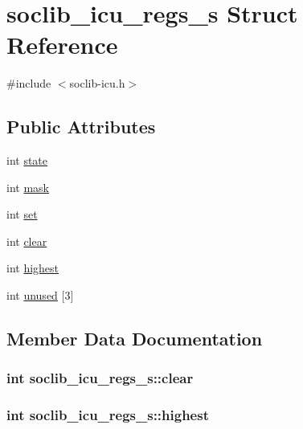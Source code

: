 \hypertarget{structsoclib__icu__regs__s}{\section{soclib\-\_\-icu\-\_\-regs\-\_\-s Struct Reference}
\label{structsoclib__icu__regs__s}
}


{\ttfamily \#include $<$soclib-\/icu.\-h$>$}

\subsection*{Public Attributes}
\begin{DoxyCompactItemize}
\item 
int \hyperlink{structsoclib__icu__regs__s_a598718b6403f6a06261e28246093c3c6}{state}
\item 
int \hyperlink{structsoclib__icu__regs__s_a441bc8ac5b4fafd3a010fc0407f1d15d}{mask}
\item 
int \hyperlink{structsoclib__icu__regs__s_ac739bbbb3c2ebdd3e56126a8f894809b}{set}
\item 
int \hyperlink{structsoclib__icu__regs__s_a485b5677413877338ce99052420f59c2}{clear}
\item 
int \hyperlink{structsoclib__icu__regs__s_ad5b9303a7fc90c52cb55445faeb8b609}{highest}
\item 
int \hyperlink{structsoclib__icu__regs__s_a45909716b5e6626bb1bbb1b94bb366ed}{unused} \mbox{[}3\mbox{]}
\end{DoxyCompactItemize}


\subsection{Member Data Documentation}
\hypertarget{structsoclib__icu__regs__s_a485b5677413877338ce99052420f59c2}{
\subsubsection[{clear}]{\setlength{\rightskip}{0pt plus 5cm}int soclib\-\_\-icu\-\_\-regs\-\_\-s\-::clear}}\label{structsoclib__icu__regs__s_a485b5677413877338ce99052420f59c2}
\hypertarget{structsoclib__icu__regs__s_ad5b9303a7fc90c52cb55445faeb8b609}{
\subsubsection[{highest}]{\setlength{\rightskip}{0pt plus 5cm}int soclib\-\_\-icu\-\_\-regs\-\_\-s\-::highest}}\label{structsoclib__icu__regs__s_ad5b9303a7fc90c52cb55445faeb8b609}


